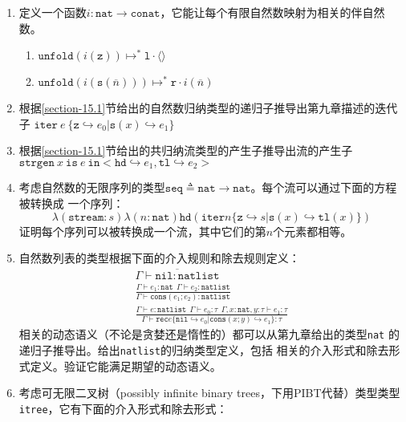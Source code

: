 \begin{enumerate}
	\item 定义一个函数$i:\texttt{nat}\rightarrow \texttt{conat}$，它能让每个有限自然数映射为相关的伴自然数。
	\begin{enumerate}
		\renewcommand{\theenumi}{\alph{enumi}}
		\item $\texttt{unfold}(i(\texttt{z}))\mapsto^*\texttt{l}\cdot\langle\rangle$
		\item $\texttt{unfold}(i(\texttt{s}(\overline{n})))\mapsto^*\texttt{r}\cdot i(\overline{n})$
	\end{enumerate}
	\item 根据\ref{section-15.1}节给出的自然数归纳类型的递归子推导出第九章描述的迭代子
	$\texttt{iter}\ e\ \{\texttt{z}\hookrightarrow e_0|\texttt{s}(x)\hookrightarrow e_1\}$
	\item 根据\ref{section-15.1}节给出的共归纳流类型的产生子推导出流的产生子$\texttt{strgen}\ x\ \texttt{is}\  e\ \texttt{in}
	<\texttt{hd}\hookrightarrow e_1, \texttt{tl}\hookrightarrow e_2>$
	\item 考虑自然数的无限序列的类型$\texttt{seq}\triangleq\texttt{nat}\rightarrow\texttt{nat}$。每个流可以通过下面的方程被转换成
	一个序列：$$\lambda(\texttt{stream}:s)\lambda(n:\texttt{nat})\texttt{hd}(\texttt{iter} n
	\{\texttt{z}\hookrightarrow s|\texttt{s}(x)\hookrightarrow\texttt{tl}(x)\})$$
	证明每个序列可以被转换成一个流，其中它们的第$n$个元素都相等。
	\item 自然数列表的类型根据下面的介入规则和除去规则定义：
	\begin{subequations}
		\begin{gather}
		\overline{\Gamma\vdash\texttt{nil}:\texttt{natlist}} \\
		\frac{\Gamma\vdash e_1:\texttt{nat}\ \ \Gamma\vdash e_2:\texttt{natlist}}
		{\Gamma\vdash\texttt{cons}(e_1;e_2):\texttt{natlist}} \\
		\frac{\Gamma\vdash e:\texttt{natlist}\ \ \Gamma\vdash e_0:\tau\ \ \Gamma,x:\texttt{nat},y:\tau\vdash e_1:\tau}
		{\Gamma\vdash\texttt{rec} e\{\texttt{nil}\hookrightarrow e_0|\texttt{cons}(x;y)\hookrightarrow e_1\}:\tau}
		\end{gather}
	\end{subequations}
	相关的动态语义（不论是贪婪还是惰性的）都可以从第九章给出的类型\texttt{nat} 的递归子推导出。给出\texttt{natlist}的归纳类型定义，包括
	相关的介入形式和除去形式定义。验证它能满足期望的动态语义。
	\item 考虑可无限二叉树（possibly infinite binary trees，下用PIBT代替）类型类型\texttt{itree}，它有下面的介入形式和除去形式：

\end{enumerate}
